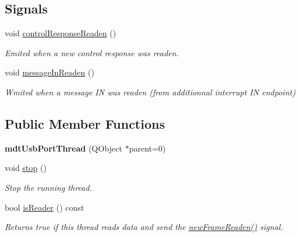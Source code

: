 \subsection*{Signals}
\begin{DoxyCompactItemize}
\item 
\hypertarget{classmdt_usb_port_thread_ab8ac3a6e1b571215be86f9dfd8c48b2b}{
void \hyperlink{classmdt_usb_port_thread_ab8ac3a6e1b571215be86f9dfd8c48b2b}{controlResponseReaden} ()}
\label{classmdt_usb_port_thread_ab8ac3a6e1b571215be86f9dfd8c48b2b}

\begin{DoxyCompactList}\small\item\em Emited when a new control response was readen. \end{DoxyCompactList}\item 
\hypertarget{classmdt_usb_port_thread_a850204a909f0bbe41c5e995ebe3670d8}{
void \hyperlink{classmdt_usb_port_thread_a850204a909f0bbe41c5e995ebe3670d8}{messageInReaden} ()}
\label{classmdt_usb_port_thread_a850204a909f0bbe41c5e995ebe3670d8}

\begin{DoxyCompactList}\small\item\em Wmited when a message IN was readen (from additionnal interrupt IN endpoint) \end{DoxyCompactList}\end{DoxyCompactItemize}
\subsection*{Public Member Functions}
\begin{DoxyCompactItemize}
\item 
\hypertarget{classmdt_usb_port_thread_aaf4e5883224f05d80132b31a921ac899}{
{\bfseries mdtUsbPortThread} (QObject $\ast$parent=0)}
\label{classmdt_usb_port_thread_aaf4e5883224f05d80132b31a921ac899}

\item 
void \hyperlink{classmdt_usb_port_thread_a0be9bce0248ada81087282deea70505b}{stop} ()
\begin{DoxyCompactList}\small\item\em Stop the running thread. \end{DoxyCompactList}\item 
bool \hyperlink{classmdt_usb_port_thread_aed82b57c84745f1e2391750697db1022}{isReader} () const 
\begin{DoxyCompactList}\small\item\em Returns true if this thread reads data and send the \hyperlink{classmdt_port_thread_a7fc2245c753fd65e1beffec211c41461}{newFrameReaden()} signal. \end{DoxyCompactList}\end{DoxyCompactItemize}


